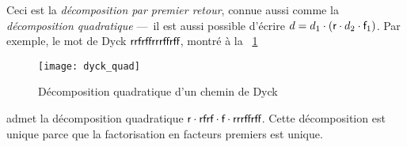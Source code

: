 Ceci est la \emph{décomposition par premier retour}, connue aussi comme la
\emph{décomposition quadratique} ---~il est aussi possible
d'écrire \(d = d_1 \cdot (\textsf{r} \cdot d_2 \cdot \textsf{f}_1)\). Par
exemple, le mot de Dyck \(\textsf{rrfrffrrrffrff}\), montré à la
\fig~\ref{fig:dyck_quad}
\begin{figure}
\centering
\texttt{[image: dyck\_quad]}
\caption{Décomposition quadratique d'un chemin de Dyck
\label{fig:dyck_quad}}
\end{figure}
admet la décomposition quadratique \(\textsf{r} \cdot \textsf{rfrf} \cdot
\textsf{f} \cdot \textsf{rrrffrff}\). Cette décomposition est unique parce
que la factorisation en facteurs premiers est unique.


